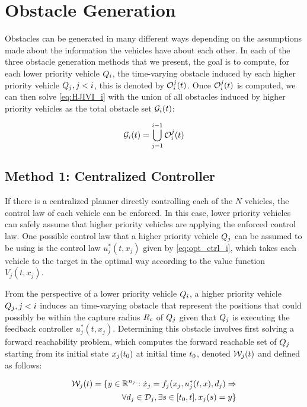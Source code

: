 \section{Obstacle Generation \label{sec:obs_gen}}
Obstacles can be generated in many different ways depending on the assumptions made about the information the vehicles have about each other. In each of the three obstacle generation methods that we present, the goal is to compute, for each lower priority vehicle $Q_i$, the time-varying obstacle induced by each higher priority vehicle $Q_j, j < i$, this is denoted by $\mathcal{O}_i^j(t)$. Once $\mathcal{O}_i^j(t)$ is computed, we can then solve \eqref{eq:HJIVI_i} with the union of all obstacles induced by higher priority vehicles as the total obstacle set $\mathcal{G}_i(t)$:

\begin{equation}
\mathcal{G}_i(t) = \bigcup_{j=1}^{i-1}\mathcal{O}_i^j(t)
\end{equation}

\subsection{Method 1: Centralized Controller \label{sec:cc}}
If there is a centralized planner directly controlling each of the $N$ vehicles, the control law of each vehicle can be enforced. In this case, lower priority vehicles can safely assume that higher priority vehicles are applying the enforced control law. One possible control law that a higher priority vehicle $Q_j$ can be assumed to be using is the control law $u_j^*(t, x_j)$ given by \eqref{eq:opt_ctrl_i}, which takes each vehicle to the target in the optimal way according to the value function $V_j(t, x_j)$.

From the perspective of a lower priority vehicle $Q_i$, a higher priority vehicle $Q_j, j < i$ induces an time-varying obstacle that represent the positions that could possibly be within the capture radius $R_c$ of $Q_j$ given that $Q_j$ is executing the feedback controller $u_j^*(t, x_j)$. Determining this obstacle involves first solving a forward reachability problem, which computes the forward reachable set of $Q_j$ starting from its initial state $x_j(t_0)$ at initial time $t_0$, denoted $\mathcal{W}_j(t)$ and defined as follows:

\begin{equation}
\label{eq:frs}
\begin{aligned}
\mathcal{W}_j(t) = \{y \in \mathbb{R}^{n_j}: \dot{x}_j = f_j(x_j, u_j^*(t, x), d_j) \Rightarrow \\
\forall d_j \in \mathcal{D}_j, \exists s \in [t_0, t], x_j(s) = y\}
\end{aligned}
\end{equation}


